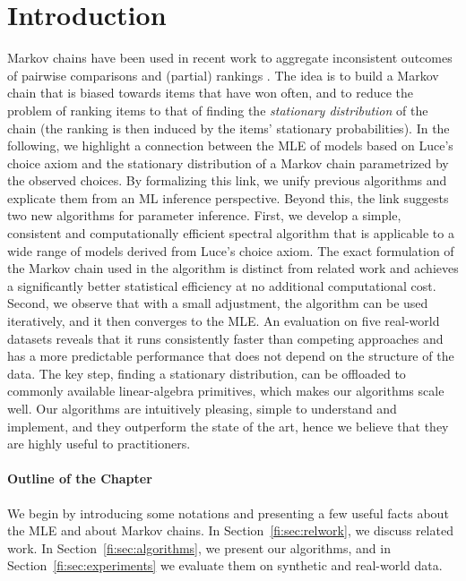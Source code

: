 \section{Introduction}
\label{fi:sec:intro}

Markov chains have been used in recent work to aggregate inconsistent outcomes of pairwise comparisons and (partial) rankings \citep{dwork2001rank, negahban2012iterative, azari2013generalized}.
The idea is to build a Markov chain that is biased towards items that have won often, and to reduce the problem of ranking items to that of finding the \emph{stationary distribution} of the chain (the ranking is then induced by the items' stationary probabilities).
In the following, we highlight a connection between the MLE of models based on Luce's choice axiom and the stationary distribution of a Markov chain parametrized by the observed choices.
By formalizing this link, we unify previous algorithms and explicate them from an ML inference perspective.
Beyond this, the link suggests two new algorithms for parameter inference.
First, we develop a simple, consistent and computationally efficient spectral algorithm that is applicable to a wide range of models derived from Luce's choice axiom.
The exact formulation of the Markov chain used in the algorithm is distinct from related work \citep{negahban2012iterative, azari2013generalized} and achieves a significantly better statistical efficiency at no additional computational cost.
Second, we observe that with a small adjustment, the algorithm can be used iteratively, and it then converges to the MLE.
An evaluation on five real-world datasets reveals that it runs consistently faster than competing approaches and has a more predictable performance that does not depend on the structure of the data.
The key step, finding a stationary distribution, can be offloaded to commonly available linear-algebra primitives, which makes our algorithms  scale well.
Our algorithms are intuitively pleasing, simple to understand and implement, and they outperform the state of the art, hence we believe that they are highly useful to practitioners.

\paragraph{Outline of the Chapter}
We begin by introducing some notations and presenting a few useful facts about the MLE and about Markov chains.
In Section~\ref{fi:sec:relwork}, we discuss related work.
In Section~\ref{fi:sec:algorithms}, we present our algorithms, and in Section~\ref{fi:sec:experiments} we evaluate them on synthetic and real-world data.


